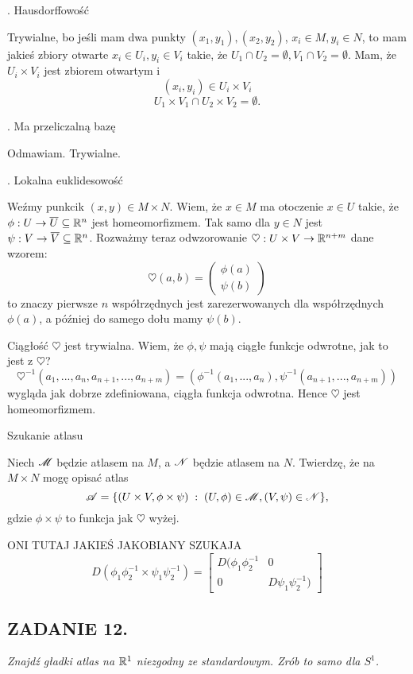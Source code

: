 . Hausdorffowość

Trywialne, bo jeśli mam dwa punkty $(x_1,y_1), (x_2,y_2)$, $x_i\in M,y_i\in N$, to mam jakieś zbiory otwarte $x_i\in U_i,y_i\in V_i$ takie, że $U_1\cap U_2=\emptyset,V_1\cap V_2=\emptyset$. Mam, że $U_i\times V_i$ jest zbiorem otwartym i
$$(x_i,y_i)\in U_i\times V_i$$
$$U_1\times V_1\cap U_2\times V_2=\emptyset.$$

. Ma przeliczalną bazę

Odmawiam. Trywialne.

. Lokalna euklidesowość

Weźmy punkcik $(x,y)\in M\times N$. Wiem, że $x\in M$ ma otoczenie $x\in U$ takie, że $\phi:U\to \overline U\subseteq \mathbb{R}^n$ jest homeomorfizmem. Tak samo dla $y\in N$ jest $\psi:V\to \overline V\subseteq \mathbb{R}^n$. Rozważmy teraz odwzorowanie $\heartsuit:U\times V\to \mathbb{R}^{n+m}$ dane wzorem:
$$\heartsuit(a, b)=\begin{pmatrix}
    \phi(a)\\
    \psi(b)
\end{pmatrix}$$
to znaczy pierwsze $n$ współrzędnych jest zarezerwowanych dla współrzędnych $\phi(a)$, a później do samego dołu mamy $\psi(b)$.

Ciągłość $\heartsuit$ jest trywialna. Wiem, że $\phi,\psi$ mają ciągłe funkcje odwrotne, jak to jest z $\heartsuit$?
$$\heartsuit^{-1}(a_1,...,a_n,a_{n+1},...,a_{n+m})=(\phi^{-1}(a_1,...,a_n), \psi^{-1}(a_{n+1},...,a_{n+m}))$$
wygląda jak dobrze zdefiniowana, ciągła funkcja odwrotna. Hence $\heartsuit$ jest homeomorfizmem.

\indent Szukanie atlasu

Niech $\mathcal{M}$ będzie atlasem na $M$, a $\mathcal{N}$ będzie atlasem na $N$. Twierdzę, że na $M\times N$ mogę opisać atlas 
$$\mathcal{A}=\{(U\times V, \phi\times\psi)\;:\;(U, \phi)\in\mathcal{M}, (V,\psi)\in\mathcal{N}\},$$
gdzie $\phi\times\psi$ to funkcja jak $\heartsuit$ wyżej.

ONI TUTAJ JAKIEŚ JAKOBIANY SZUKAJA
$$D(\phi_1\phi_2^{-1}\times\psi_1\psi_2^{-1})=\begin{bmatrix}
    D(\phi_1\phi_2^{-1}&0\\0&D\psi_1\psi_2^{-1})
\end{bmatrix}$$

\subsection*{ZADANIE 12.}
\emph{\color{pink}Znajdź gładki atlas na $\mathbb{R}^1$ niezgodny ze standardowym. Zrób to samo dla $S^1$.}
\medskip

